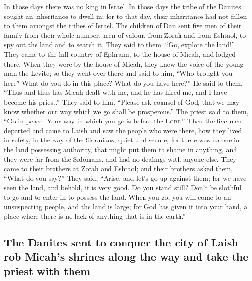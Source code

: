 In those days there was no king in Israel. In those days
the tribe of the Danites sought an inheritance to dwell in; for to that
day, their inheritance had not fallen to them amongst the tribes of
Israel.  The children of Dan sent five men of their family
from their whole number, men of valour, from Zorah and from Eshtaol, to
spy out the land and to search it. They said to them, ``Go, explore the
land!'' They came to the hill country of Ephraim, to the house of Micah,
and lodged there.  When they were by the house of Micah,
they knew the voice of the young man the Levite; so they went over there
and said to him, ``Who brought you here? What do you do in this place?
What do you have here?''  He said to them, ``Thus and thus
has Micah dealt with me, and he has hired me, and I have become his
priest.''  They said to him, ``Please ask counsel of God,
that we may know whether our way which we go shall be prosperous.''
 The priest said to them, ``Go in peace. Your way in which
you go is before the \textsc{Lord}.''  Then the five men
departed and came to Laish and saw the people who were there, how they
lived in safety, in the way of the Sidonians, quiet and secure; for
there was no one in the land possessing authority, that might put them
to shame in anything, and they were far from the Sidonians, and had no
dealings with anyone else.  They came to their brothers at
Zorah and Eshtaol; and their brothers asked them, ``What do you say?''
 They said, ``Arise, and let's go up against them; for we
have seen the land, and behold, it is very good. Do you stand still?
Don't be slothful to go and to enter in to possess the land.
 When you go, you will come to an unsuspecting people,
and the land is large; for God has given it into your hand, a place
where there is no lack of anything that is in the earth.''

\hypertarget{the-danites-sent-to-conquer-the-city-of-laish-rob-micahs-shrines-along-the-way-and-take-the-priest-with-them}{%
\subsection{The Danites sent to conquer the city of Laish rob Micah's
shrines along the way and take the priest with
them}\label{the-danites-sent-to-conquer-the-city-of-laish-rob-micahs-shrines-along-the-way-and-take-the-priest-with-them}}

